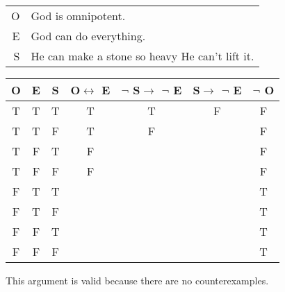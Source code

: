 \begin{tabular}{r l}
    O & God is omnipotent. \\
    E & God can do everything. \\
    S & He can make a stone so heavy He can't lift it.
\end{tabular}

\begin{tabular}{c|c|c||c|c|c||c}
    O & E & S & O$\leftrightarrow$ E & $\lnot$ S$\rightarrow$ $\lnot$ E & S$\rightarrow$ $\lnot$ E & $\lnot$ O \\
    \hline
    T & T & T & T & T & F & F \\
    T & T & F & T & F &   & F \\
    T & F & T & F &   &   & F \\
    T & F & F & F &   &   & F \\
    F & T & T &   &   &   & T \\
    F & T & F &   &   &   & T \\
    F & F & T &   &   &   & T \\
    F & F & F &   &   &   & T
\end{tabular}

\noindent This argument is valid because there are no counterexamples.